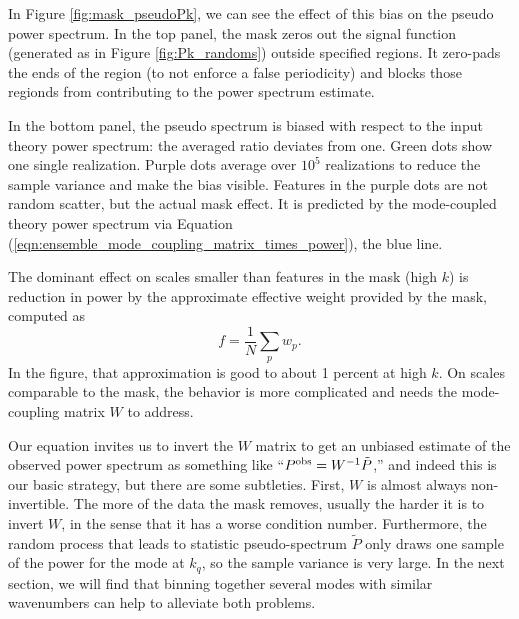 In Figure \ref{fig:mask_pseudoPk}, we can see the effect of this bias on the pseudo power spectrum.  In the top panel, the mask zeros out  the signal function (generated as in Figure \ref{fig:Pk_randoms}) outside specified regions.  It zero-pads the ends of the region (to not enforce a false periodicity) and blocks those regionds from contributing to the power spectrum estimate.

In the bottom panel, the pseudo spectrum is biased with respect to the input theory power spectrum: the averaged ratio deviates from one.  Green dots show one single realization.  Purple dots average over $10^5$ realizations to reduce the sample variance and make the bias visible.  Features in the purple dots are not random scatter, but the actual mask effect.  It is predicted by the mode-coupled theory power spectrum via Equation (\ref{eqn:ensemble_mode_coupling_matrix_times_power}), the blue line.

The dominant effect on scales smaller than features in the mask (high $k$) is reduction in power by the approximate effective weight provided by the mask, computed as
\begin{equation}
  f = \frac{1}{N} \sum_p w_p.
\end{equation}
In the figure, that approximation is good to about 1 percent at high $k$.  
  On scales comparable to the mask, the behavior is more complicated and needs the mode-coupling matrix $W$ to address.

Our equation invites us to invert the $W$ matrix to get an unbiased estimate of the observed power spectrum as something like ``${P}^{\rm obs} = W^{-1} \tilde P$,'' and indeed this is our basic strategy, but there are some subtleties.  First, $W$ is almost always non-invertible.  The more of the data the mask removes, usually the harder it is to invert $W$, in the sense that it has a worse condition number.  Furthermore, the random process that leads to statistic pseudo-spectrum $\tilde P$ only draws one sample of the power for the mode at $k_q$, so the sample variance is very large.  In the next section, we will find that binning together several modes with similar wavenumbers can help to alleviate both problems.

